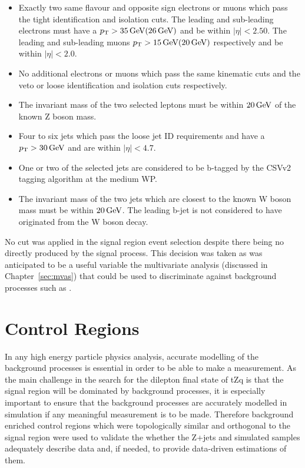 \begin{itemize}
\item Exactly two same flavour and opposite sign electrons or muons which pass the tight identification and isolation cuts. The leading and sub-leading electrons must have a $p_{\mathrm{T}} > 35\,\text{Ge\hspace{-.08em}V} (26\,\text{Ge\hspace{-.08em}V})$ and be within $|\eta| < 2.50$. The leading and sub-leading muons $p_{\mathrm{T}} > 15\,\text{Ge\hspace{-.08em}V} (20\,\text{Ge\hspace{-.08em}V})$ respectively and be within $|\eta| < 2.0$.
\item No additional electrons or muons which pass the same kinematic cuts and the veto or loose identification and isolation cuts respectively. 
\item The invariant mass of the two selected leptons must be within $20\,\text{Ge\hspace{-.08em}V}$ of the known Z boson mass.
\item Four to six jets which pass the loose jet ID requirements and have a $p_{\mathrm{T}} > 30\,\text{Ge\hspace{-.08em}V}$ and are within $|\eta| < 4.7$.
\item One or two of the selected jets are considered to be b-tagged by the CSVv2 tagging algorithm at the medium WP.
\item The invariant mass of the two jets which are closest to the known W boson mass must be within $20\,\text{Ge\hspace{-.08em}V}$. The leading b-jet is not considered to have originated from the W boson decay.
\end{itemize}

No \MET cut was applied in the signal region event selection despite there being no \MET directly produced by the signal process.
This decision was taken as \MET was anticipated to be a useful variable the multivariate analysis (discussed in Chapter~\ref{sec:mvas}) that could be used to discriminate against background processes such as \ttbar.

\section{Control Regions}\label{sec:controlRegions}
In any high energy particle physics analysis, accurate modelling of the background processes is essential in order to be able to make a measurement.
As the main challenge in the search for the dilepton final state of tZq is that the signal region will be dominated by background processes, it is especially important to ensure that the background processes are accurately modelled in simulation if any meaningful measurement is to be made.
Therefore background enriched control regions which were topologically similar and orthogonal to the signal region were used to validate the whether the Z+jets and \ttbar simulated samples adequately describe data and, if needed, to provide data-driven estimations of them.


